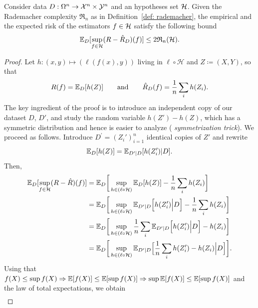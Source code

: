 \documentclass[reqno]{amsart}
\begin{document}
\begin{proposition}[Symmetrization]\label{prop: symmetriz}
    Consider data $D: \Omega^n \to \mathcal{X}^n \times \mathcal{Y}^n$ and an hypotheses set $\mathcal{H}$. Given the Rademacher complexity $\mathfrak R_n$ as in Definition~\ref{def: rademacher}, the empirical and the expected risk of the estimators $f\in\mathcal{H}$ satisfy the following bound
    \begin{equation}
        \mathbb{E}_D[\sup_{f\in\mathcal{H}} (R-\hat R_D) (f)] \le 2 \mathfrak R_n(\mathcal{H}).
    \end{equation}
    \begin{proof}
        Let $h:(x,y)\mapsto(\ell(f(x),y))$ living in $\ell \circ \mathcal H$ and $Z\coloneqq(X,Y)$, so that
        \begin{equation*}
            R(f) =  \mathbb{E}_D[h(Z)] \qquad \text{and} \qquad
            \hat R_D(f) = \frac{1}{n}\sum_{i} h(Z_i).
        \end{equation*}
        The key ingredient of the proof is to introduce an independent copy of our dataset $D$, $D'$, and study the random variable $h(Z') - h(Z)$, which has a symmetric distribution and hence is easier to analyze ({\it\/ symmetrization trick}). 
        We proceed as follows. 
        Introduce $D^\prime = {(Z_i')}_{i=1}^n$ identical copies of $Z'$ and rewrite
        \begin{equation}
            \mathbb{E}_D[h(Z)] = \mathbb{E}_{D^\prime\vert D} [h(Z_i')\vert D].
        \end{equation}
        Then,
        \begin{align}
            \mathbb{E}_D[\sup_{f\in\mathcal{H}} (R-\hat R) (f)] &= \mathbb{E}_D\bigg[\sup_{h\in(\ell\circ\mathcal H)} \mathbb{E}_D[h(Z)] - \frac{1}{n}\sum_i h(Z_i)\bigg] \notag\\
            &= \mathbb{E}_D\bigg[\sup_{h\in(\ell\circ\mathcal H)} \mathbb{E}_{D^\prime\vert D} \Big[h(Z_i')\Big\vert D\Big] - \frac{1}{n}\sum_i h(Z_i)\bigg] \notag\\\notag
            &= \mathbb{E}_D\bigg[\sup_{h\in(\ell\circ\mathcal H)} \frac{1}{n} \sum_i \mathbb{E}_{D^\prime\vert D} \Big[h(Z_i')\Big\vert D\Big]-  h(Z_i) \bigg]\\
            &= \mathbb{E}_D\bigg[\sup_{h\in(\ell\circ\mathcal H)}  \mathbb{E}_{D^\prime\vert D} \Big[ \frac{1}{n} \sum_i h(Z_i')-  h(Z_i)\Big\vert D\Big] \bigg].
        \end{align} 
        Using that $f(X)\le \sup f(X) \Rightarrow \mathbb{E}[f(X)]\le \mathbb{E}[\sup f(X)] \Rightarrow \sup \mathbb{E}[f(X)]\le \mathbb{E}[\sup f(X)]$ and the law of total expectations, we obtain
        \begin{align}

\end{align}
\end{proof}
\end{proposition}
\end{document}
